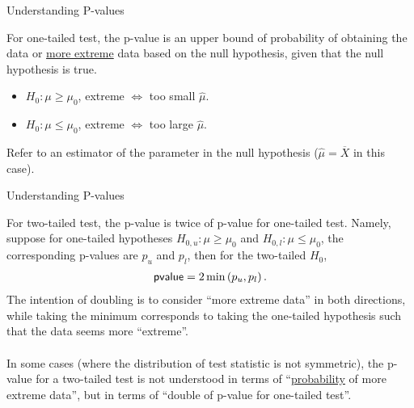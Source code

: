 \begin{frame}{Understanding P-values}

\justifying
{} For one-tailed test, the p-value is an upper bound of probability of obtaining the data or \underline{more extreme} data based on the null hypothesis, given that the null hypothesis is true.
\begin{itemize}
	\item $H_0: \mu \geq \mu_0$, extreme $\Leftrightarrow$ too small $\widehat{\mu}$.
	\item $H_0: \mu \leq \mu_0$, extreme $\Leftrightarrow$ too large $\widehat{\mu}$.
\end{itemize}
 Refer to an estimator of the parameter in the null hypothesis ($\widehat{\mu} = \overline{X}$ in this case). \\

\end{frame}


\begin{frame}{Understanding P-values}

\justifying
{} For two-tailed test, the p-value is twice of p-value for one-tailed test. Namely, suppose for one-tailed hypotheses $H_{0, u}: \mu \geq \mu_0$ and $H_{0, l}: \mu \leq \mu_0$, the corresponding p-values are $p_{u}$ and $p_{l}$, then for the two-tailed $H_0$,
\begin{align*}
\mathsf{pvalue} = 2\min\left(p_{u}, p_l \right).
\end{align*}
The intention of doubling is to consider ``more extreme data'' in both directions, while taking the minimum corresponds to taking the one-tailed hypothesis such that the data seems more ``extreme''. \\
~\\
In some cases (where the distribution of test statistic is not symmetric), the p-value for a two-tailed test is not understood in terms of ``\underline{probability} of more extreme data'', but in terms of ``double of p-value for one-tailed test''.

\end{frame}


